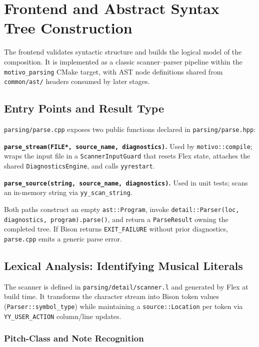 \section{Frontend and Abstract Syntax Tree Construction}\label{sec:implementation-frontend}

The frontend validates syntactic structure and builds the logical model of the composition.
It is implemented as a classic scanner--parser pipeline within the \texttt{motivo\_parsing} CMake target, with AST node
definitions shared from \texttt{common/ast/} headers consumed by later stages.

\subsection{Entry Points and Result Type}\label{detail-subsec:frontend-entry-points}

\texttt{parsing/parse.cpp} exposes two public functions declared in \texttt{parsing/parse.hpp}:

\noindent \textbf{\texttt{parse\_stream(FILE*, source\_name, diagnostics)}.} Used by \texttt{motivo::compile}; wraps
the input file in a \texttt{ScannerInputGuard} that resets Flex state, attaches the shared
\texttt{DiagnosticsEngine}, and calls \texttt{yyrestart}.

\noindent \textbf{\texttt{parse\_source(string, source\_name, diagnostics)}.} Used in unit tests; scans an in-memory
string via \texttt{yy\_scan\_string}.

Both paths construct an empty \texttt{ast::Program}, invoke \texttt{detail::Parser(loc, diagnostics,
program).parse()}, and return a \texttt{ParseResult} owning the completed tree.
If Bison returns \texttt{EXIT\_FAILURE} without prior diagnostics, \texttt{parse.cpp} emits a generic parse error.

\subsection{Lexical Analysis: Identifying Musical
Literals}\label{detail-subsec:lexical-analysis:-identifying-musical-literals}

The scanner is defined in \texttt{parsing/detail/scanner.l} and generated by Flex at build time.
It transforms the character stream into Bison token values (\texttt{Parser::symbol\_type}) while maintaining a
\texttt{source::Location} per token via \texttt{YY\_USER\_ACTION} column/line updates.

\subsubsection{Pitch-Class and Note Recognition}


